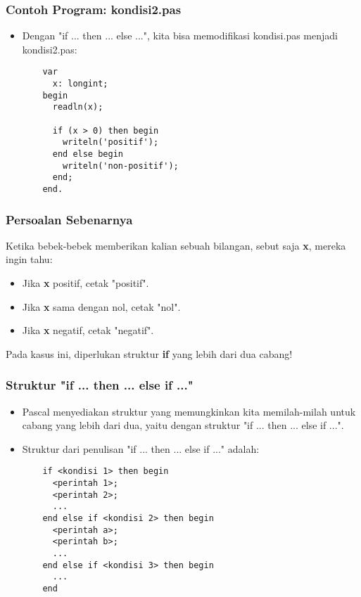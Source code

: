 \begin{frame}[fragile]
\frametitle{Contoh Program: kondisi2.pas}
\begin{itemize}
  \item Dengan "if ... then ... else ...", kita bisa memodifikasi kondisi.pas menjadi kondisi2.pas:
  \begin{lstlisting}
    var
      x: longint;
    begin
      readln(x);

      if (x > 0) then begin
        writeln('positif');
      end else begin
        writeln('non-positif');
      end;
    end.
  \end{lstlisting}
\end{itemize}
\end{frame}

\begin{frame}
\frametitle{Persoalan Sebenarnya}
Ketika bebek-bebek memberikan kalian sebuah bilangan, sebut saja \textbf{x}, mereka ingin tahu:
\begin{itemize}
  \item Jika \textbf{x} positif, cetak "positif".
  \item Jika \textbf{x} sama dengan nol, cetak "nol".
  \item Jika \textbf{x} negatif, cetak "negatif".
\end{itemize}

Pada kasus ini, diperlukan struktur \textbf{if} yang lebih dari dua cabang!
\end{frame}

\begin{frame}[fragile]
\frametitle{Struktur "if ... then ... else if ..."}
\begin{itemize}
  \item Pascal menyediakan struktur yang memungkinkan kita memilah-milah untuk cabang yang lebih dari dua, yaitu dengan struktur "if ... then ... else if ...".
  \item Struktur dari penulisan "if ... then ... else if ..." adalah:
  \begin{lstlisting}
    if <kondisi 1> then begin
      <perintah 1>;
      <perintah 2>;
      ...
    end else if <kondisi 2> then begin
      <perintah a>;
      <perintah b>;
      ...
    end else if <kondisi 3> then begin
      ...
    end
  \end{lstlisting}

\end{itemize}
\end{frame}


